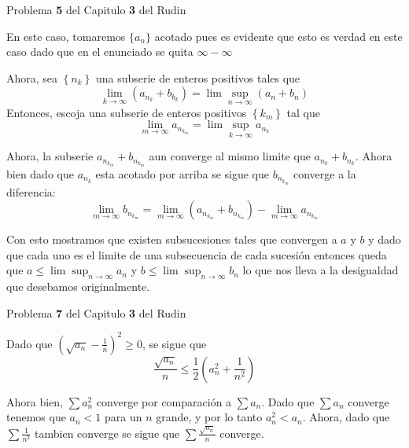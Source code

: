 \documentclass[12pt]{article}
\newenvironment{ex}[2][Ejercicio]{\begin{trivlist}
\item[\hskip \labelsep {\bfseries #1}\hskip \labelsep {\bfseries #2.}]}{\end{trivlist}}
\newenvironment{sol}[1][Solución]{\begin{trivlist}
\item[\hskip \labelsep {\bfseries #1:}]}{\end{trivlist}}
\begin{document}
\begin{ex}{1}
  Problema \textbf{5} del Capitulo \textbf{3} del Rudin
\end{ex}
\begin{sol}
  En este caso, tomaremos $\{a_n\}$ acotado pues es evidente que esto es verdad en este caso dado que en el enunciado se quita $\infty - \infty $

  Ahora, sea $\left\{n_k\right\}$ una subserie de enteros positivos tales que \[
    \displaystyle\lim_{k \to \infty} \left(a_{n_k} + b_{b_k}\right) = \displaystyle\lim\sup_{n \to \infty} (a_n + b_n)
  \] Entonces, escoja una subserie de enteros positivos $\left\{k_m\right\}$ tal que \[
    \displaystyle\lim_{m \to \infty} a_{n_{k_m}} = \displaystyle\lim\sup_{k\to\infty} a_{n_k}
  \]

  Ahora, la subserie $a_{n_{k_m}} + b_{n_{k_m}}$ aun converge al mismo limite que $a_{n_k} + b_{n_k}$. Ahora bien dado que $a_{n_k}$ esta acotado por arriba se sigue que $b_{n_{k_m}}$ converge a la diferencia:
  \[
    \displaystyle\lim_{m\to\infty} b_{n_{k_m}} = \displaystyle\lim_{m\to\infty} (a_{n_{k_m}} + b_{n_{k_m}}) - \displaystyle\lim_{m\to\infty} a_{n_{k_m}}
  \]

  Con esto mostramos que existen subsucesiones tales que convergen a $a$ y $b$ y dado que cada uno es el limite de una subsecuencia de cada sucesión entonces queda que $a \le \displaystyle\lim\sup_{n\to\infty} a_n$ y $b \le \displaystyle\lim\sup_{n\to\infty} b_n$ lo que nos lleva a la desigualdad que desebamos originalmente.
\end{sol}

\begin{ex}{2}
  Problema \textbf{7} del Capitulo \textbf{3} del Rudin
\end{ex}
\begin{sol}
  Dado que $\left(\sqrt{a_n} - \frac{1}{n}\right)^2 \ge 0$, se sigue que \[
    \frac{\sqrt{a_n}}{n} \le \frac{1}{2}\left(a_n^2 + \frac{1}{n^2}\right)
  \]

  Ahora bien, $\displaystyle\sum a_n^2$ converge por comparación a $\displaystyle\sum a_n$. Dado que $\displaystyle\sum a_n$ converge tenemos que $a_n < 1$ para un $n$ grande, y por lo tanto $a_n^2 < a_n$. Ahora, dado que $\displaystyle\sum \displaystyle\frac{1}{n^2}$ tambien converge se sigue que $\displaystyle\sum \displaystyle\frac{\sqrt{a_n}}{n}$ converge.
\end{sol}
\end{document}
